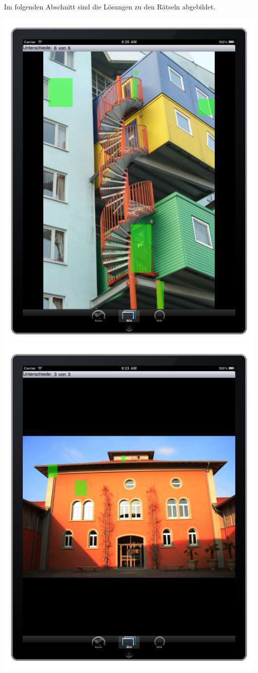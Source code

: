 Im folgenden Abschnitt sind die Lösungen zu den Rätseln abgebildet.


  \includegraphics[width=1.0\textwidth]{bilder/loesung1.png}
  \includegraphics[width=1.0\textwidth]{bilder/loesung2.png}
